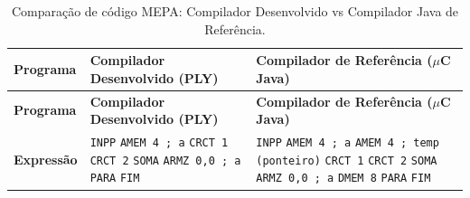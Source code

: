 \documentclass[12pt,a4paper]{article}
\begin{document}
\begin{longtable}{p{2.6cm}p{6.4cm}p{6.4cm}}
\caption{Comparação de código MEPA: Compilador Desenvolvido vs Compilador Java de Referência.}
\label{tab:comparacao}\\
\toprule
\textbf{Programa} & \textbf{Compilador Desenvolvido (PLY)} & \textbf{Compilador de Referência ($\mu$C Java)} \\
\midrule
\endfirsthead
\toprule
\textbf{Programa} & \textbf{Compilador Desenvolvido (PLY)} & \textbf{Compilador de Referência ($\mu$C Java)} \\
\midrule
\endhead
\bottomrule
\endfoot

\textbf{Expressão} &
\texttt{INPP}\newline
\texttt{AMEM 4 ; a}\newline
\texttt{CRCT 1}\newline
\texttt{CRCT 2}\newline
\texttt{SOMA}\newline
\texttt{ARMZ 0,0 ; a}\newline
\texttt{PARA}\newline
\texttt{FIM} &
\texttt{INPP}\newline
\texttt{AMEM 4 ; a}\newline
\texttt{AMEM 4 ; temp (ponteiro)}\newline
\texttt{CRCT 1}\newline
\texttt{CRCT 2}\newline
\texttt{SOMA}\newline
\texttt{ARMZ 0,0 ; a}\newline
\texttt{DMEM 8}\newline
\texttt{PARA}\newline
\texttt{FIM} \\
\midrule


\end{longtable}
\end{document}
